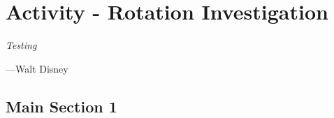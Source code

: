 
\chapter{Activity - Rotation Investigation} %

\label{Chapter5} %


\epigraph{\itshape Testing}{---Walt Disney}

\section{Main Section 1}

\lipsum[1-3]